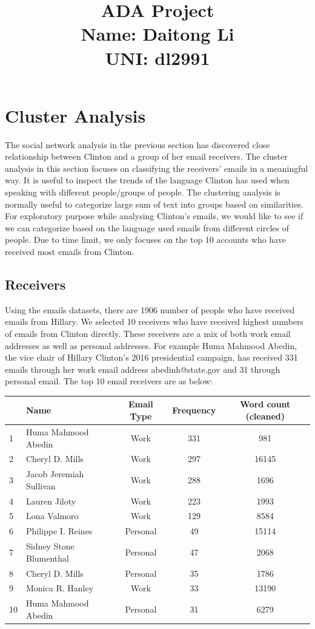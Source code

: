 \documentclass[11pt,a4paper]{article}
\title{\Large{ADA Project} 
\\ Name: Daitong Li\\ UNI: dl2991
}
\begin{document}

\maketitle
\newpage

\section*{Cluster Analysis}
The social network analysis in the previous section has discovered close relationship between Clinton and a group of her email receivers. The cluster analysis in this section focuses on classifying the receivers' emails in a meaningful way. It is useful to inspect the trends of the language Clinton has used when speaking with different people/groups of people. The clustering analysis is normally useful to categorize large sum of text into groups based on similarities. For exploratory purpose while analysing Clinton's emails, we would like to see if we can categorize based on the language used emails from different circles of people. Due to time limit, we only focuses on the top 10 accounts who have received most emails from Clinton.

\subsection*{Receivers}
Using the emails datasets, there are 1906 number of people who have received emails from Hillary. We selected 10 receivers who have received highest numbers of emails from Clinton directly.
These receivers are a mix of both work email addresses as well as personal addresses. For example Huma Mahmood Abedin, the vice chair of Hillary Clinton's 2016 presidential campaign, has received 331 emails through her work email address abedinh@state.gov and 31 through personal email. 
The top 10 email receivers are as below:
\begin{center}
  \begin{tabular}{ |l| l | c | c |c|}
    \hline
    &Name & Email Type & Frequency & Word count (cleaned)\\ \hline
    1&Huma Mahmood Abedin & Work & 331 & 981 \\ \hline
    2&Cheryl D. Mills & Work & 297 &16145 \\ \hline
    3&Jacob Jeremiah Sullivan & Work & 288 & 1696\\ \hline
    4&Lauren Jiloty & Work & 223 &1993\\ \hline
    5&Lona Valmoro & Work & 129 &8584\\ \hline
    6&Philippe I. Reines & Personal & 49 &15114\\ \hline
    7&Sidney Stone Blumenthal & Personal & 47 &2068\\ \hline
    8&Cheryl D. Mills & Personal & 35 &1786\\ \hline
    9&Monica R. Hanley & Work & 33 &13190\\ \hline
    10&Huma Mahmood Abedin & Personal & 31&6279 \\
    \hline
  \end{tabular}
\end{center}
\\
\end{document}
